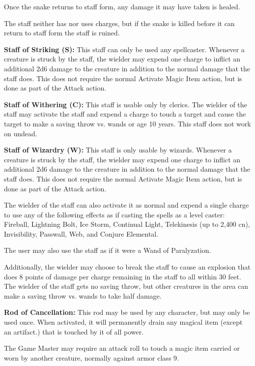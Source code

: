 \begin{multicols*}{2}
Once the snake returns to staff form, any damage it may have taken is healed.

The staff neither has nor uses charges, but if the snake is killed before it can return to staff form the staff is ruined.

\textbf{Staff of Striking (S):} This staff can only be used any spellcaster. Whenever a creature is struck by the staff, the wielder may expend one charge to inflict an additional 2d6 damage to the creature in addition to the normal damage that the staff does. This does not require the normal Activate Magic Item action, but is done as part of the Attack action.

\textbf{Staff of Withering (C):} This staff is usable only by clerics. The wielder of the staff may activate the staff and expend a charge to touch a target and cause the target to make a saving throw vs. wands or age 10 years. This staff does not work on undead.

\textbf{Staff of Wizardry (W):} This staff is only usable by wizards. Whenever a creature is struck by the staff, the wielder may expend one charge to inflict an additional 2d6 damage to the creature in addition to the normal damage that the staff does. This does not require the normal Activate Magic Item action, but is done as part of the Attack action.

The wielder of the staff can also activate it as normal and expend a single charge to use any of the following effects as if casting the spells as a  level caster: Fireball, Lightning Bolt, Ice Storm, Continual Light, Telekinesis (up to 2,400 cn), Invisibility, Passwall, Web, and Conjure Elemental.

The user may also use the staff as if it were a Wand of Paralyzation.

Additionally, the wielder may choose to break the staff to cause an explosion that does 8 points of damage per charge remaining in the staff to all within 30 feet. The wielder of the staff gets no saving throw, but other creatures in the area can make a saving throw vs. wands to take half damage.

\textbf{Rod of Cancellation:} This rod may be used by any character, but may only be used once. When activated, it will permanently drain any magical item (except an artifact.) that is touched by it of all power.

The Game Master may require an attack roll to touch a magic item carried or worn by another creature, normally against armor class 9.


\end{multicols*}
